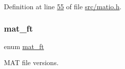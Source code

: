 Definition at line \hyperlink{src_2matio_8h_source_l00055}{55} of file \hyperlink{src_2matio_8h_source}{src/matio.\+h}.

\mbox{\label{group___m_a_t_gad03442b8378999189d510e3745c702b7}} 
\subsubsection{\texorpdfstring{mat\+\_\+ft}{mat\_ft}\hspace{0.1cm}{\footnotesize\ttfamily [1/2]}}
{\footnotesize\ttfamily enum \hyperlink{group___m_a_t_gad03442b8378999189d510e3745c702b7}{mat\+\_\+ft}}



M\+AT file versions. 

